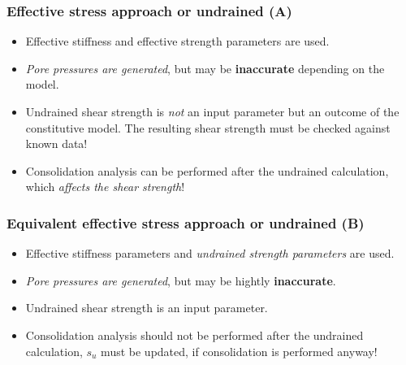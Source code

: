 \documentclass[notes]{beamer}
\begin{document}


\begin{frame}
\frametitle{Effective stress approach or undrained (A)}
\begin{itemize}
	\item Effective stiffness and effective strength parameters are used.
	\item \textit{Pore pressures are generated}, but may be \textbf{inaccurate} depending on the model.
	\item Undrained shear strength is \textit{not} an input parameter but an outcome of the constitutive model. The resulting shear strength must be checked against known data!
	\item Consolidation analysis can be performed after the undrained calculation, which \textit{affects the shear strength}!
\end{itemize}
\end{frame}

\begin{frame}
\frametitle{Equivalent effective stress approach or undrained (B)}
\begin{itemize}
	\item Effective stiffness parameters and \textit{undrained strength parameters }are used.
	\item \textit{Pore pressures are generated}, but may be hightly \textbf{inaccurate}.
	\item Undrained shear strength is an input parameter.
	\item Consolidation analysis should not be performed after the undrained calculation, $s_u$ must be updated, if consolidation is performed anyway!
\end{itemize}
\end{frame}
\end{document}
